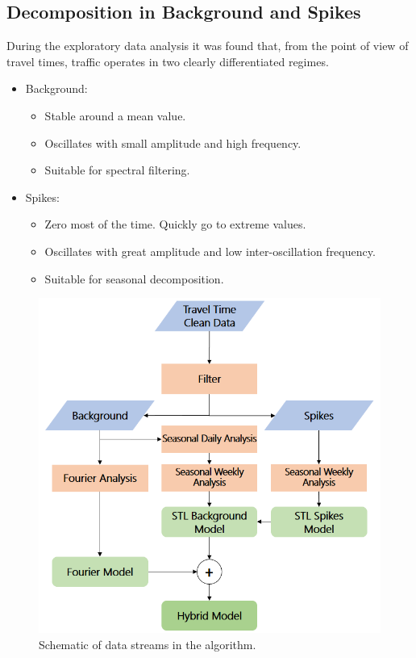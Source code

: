 \documentclass[conference, letterpaper]{IEEEtran}
\begin{document}
\subsection{Decomposition in Background and Spikes}
During the exploratory data analysis it was found that, from the point of view of travel times, traffic operates in two clearly differentiated regimes. 
\begin{itemize}
	\item Background: 
	\begin{itemize}
		\item Stable around a mean value.
		\item Oscillates with small amplitude and high frequency.
		\item Suitable for spectral filtering.
	\end{itemize}
	\item Spikes: 
	\begin{itemize}
		\item Zero most of the time. Quickly go to extreme values.
		\item Oscillates with great amplitude and low inter-oscillation frequency.
		\item Suitable for seasonal decomposition.
	\end{itemize}
\end{itemize}

\begin{figure}[htbp]
	\centering
	\includegraphics[width=\linewidth]{new_flow.png}
	\caption{Schematic of data streams in the algorithm.}
	\label{fig:flowchart}
\end{figure}
\end{document}
